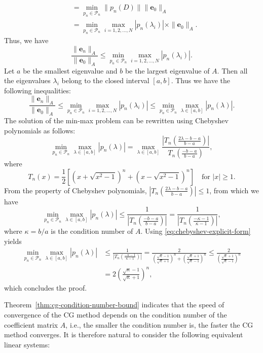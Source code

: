 \begin{Proof}
\[\begin{aligned}
&=\min_{p_n\in\mathcal P_n}\|p_n(D)\|\|\bm e_0\|_A\\
&=\min_{p_n\in\mathcal P_n}\max_{i=1,2,\ldots,N}|p_n(\lambda_i)|\times\|\bm e_0\|_A.
\end{aligned}\]
{Thus, we have}
\[\frac{\|\bm e_n\|_A}{\|\bm e_0\|_A}\le\min_{p_n\in\mathcal P_n}\max_{i=1,2,\ldots,N}|p_n(\lambda_i)|.\]
{Let $a$ be the smallest eigenvalue and $b$ be the largest eigenvalue of $A$. Then all the eigenvalues $\lambda_i$ belong to the closed interval $[a,b]$. Thus we have the following inequalities:}
\[\frac{\|\bm e_n\|_A}{\|\bm e_0\|_A}\le\min_{p_n\in\mathcal P_n}\max_{i=1,2,\ldots,N}|p_n(\lambda_i)|\le\min_{p_n\in\mathcal P_n}\max_{\lambda\in[a,b]}|p_n(\lambda)|.\]
{The solution of the min-max problem can be rewritten using Chebyshev polynomials as follows:}
\[\min_{p_n\in\mathcal P_n}\max_{\lambda\in[a,b]}|p_n(\lambda)|=\max_{\lambda\in[a,b]}\frac{|T_n(\frac{2\lambda-b-a}{b-a})|}{T_n(\frac{-b-a}{b-a})},\]
{where}
\begin{equation}\label{eq:chebyshev-explicit-form}
T_n(x)=\frac12\left[\left(x+\sqrt{x^2-1}\right)^n+\left(x-\sqrt{x^2-1}\right)^n\right]\quad\text{for }|x|\ge1.
\end{equation}
{From the property of Chebyshev polynomials, $|T_n(\frac{2\lambda-b-a}{b-a})|\le1$, from which we have}
\[\min_{p_n\in\mathcal P_n}\max_{\lambda\in[a,b]}|p_n(\lambda)|\le\frac1{|T_n(\frac{-b-a}{b-a})|}=\frac1{|T_n(\frac{-\kappa-1}{\kappa-1})|},\]
{where $\kappa=b/a$ is the condition number of $A$. Using \eqref{eq:chebyshev-explicit-form} yields}
\[\begin{aligned}
\min_{p_n\in\mathcal P_n}\max_{\lambda\in[a,b]}|p_n(\lambda)|&\le\frac1{|T_n(\frac{-\kappa-1}{\kappa-1})|}
=\frac2{\left(\frac{\sqrt\kappa-1}{\sqrt\kappa+1}\right)^n+\left(\frac{\sqrt\kappa+1}{\sqrt\kappa-1}\right)^n}
\le\frac2{\left(\frac{\sqrt\kappa+1}{\sqrt\kappa-1}\right)^n}\\
&=2\left(\frac{\sqrt\kappa-1}{\sqrt\kappa+1}\right)^n,
\end{aligned}\]
{which concludes the proof.}\end{Proof}
{Theorem\ \ref{thm:cg-condition-number-bound} indicates that the speed of convergence of the CG method depends on the condition number of the coefficient matrix $A$, i.e., the smaller the condition number is, the faster the CG method converges. It is therefore natural to consider the following equivalent linear systems:}
